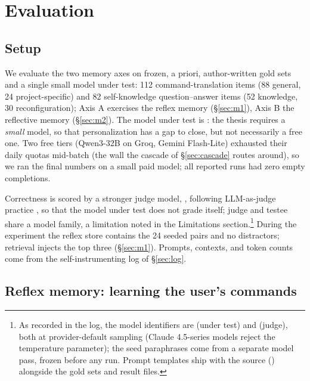 \section{Evaluation}
\label{sec:eval}

\subsection{Setup}
\label{sec:setup}

We evaluate the two memory axes on frozen, a priori, author-written gold sets and a
single small model
under test: 112 command-translation items (88
general, 24 project-specific) and 82 self-knowledge question--answer items (52
knowledge, 30 reconfiguration); Axis A exercises the reflex memory
(\S\ref{sec:m1}), Axis B the reflective memory (\S\ref{sec:m2}). The model under test is : the thesis requires a \emph{small}
model, so that personalization has a gap to close, but not necessarily a free one. Two free tiers
(Qwen3-32B on Groq, Gemini Flash-Lite) exhausted their daily quotas mid-batch (the
wall the cascade of \S\ref{sec:cascade} routes around), so we ran the final numbers
on a small paid model; all reported runs had zero empty completions.

Correctness is scored by a stronger judge model, , following
LLM-as-judge practice \citep{zheng2023judging}, so that the model under test does not
grade itself; judge and testee share a model family,
a limitation noted in the Limitations section.\footnote{As recorded in the log, the model identifiers are
 (under test) and  (judge), both at
provider-default sampling (Claude 4.5-series models reject the temperature parameter);
the seed paraphrases come from a separate model pass, frozen before any run. Prompt
templates ship with the
source () alongside the gold sets and result files.} During the experiment the reflex store contains the 24 seeded pairs and no
distractors; retrieval injects the top three (\S\ref{sec:m1}). Prompts,
contexts, and token counts come from the self-instrumenting log of \S\ref{sec:log}.

\subsection{Reflex memory: learning the user's commands}

